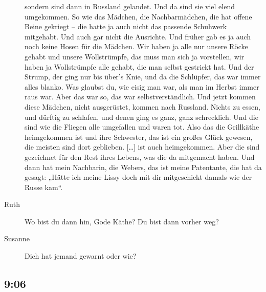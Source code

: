 \documentclass[ngerman,]{article}
\begin{document}
\begin{multicols}{3}
\begin{description}
sondern sind dann in Russland gelandet. Und da sind sie viel elend
umgekommen. So wie das Mädchen, die Nachbarmädchen, die hat offene Beine
gekriegt – die hatte ja auch nicht das passende Schuhwerk mitgehabt. Und
auch gar nicht die Ausrichte. Und früher gab es ja auch noch keine Hosen
für die Mädchen. Wir haben ja alle nur unsere Röcke gehabt und unsere
Wollstrümpfe, das muss man sich ja vorstellen, wir haben ja Wollstrümpfe
alle gehabt, die man selbst gestrickt hat. Und der Strump, der ging nur
bis über's Knie, und da die Schlüpfer, das war immer alles blanko. Was
glaubst du, wie eisig man war, als man im Herbst immer raus war. Aber
das war so, das war selbstverständlich. Und jetzt kommen diese Mädchen,
nicht ausgerüstet, kommen nach Russland. Nichts zu essen, und dürftig zu
schlafen, und denen ging es ganz, ganz schrecklich. Und die sind wie die
Fliegen alle umgefallen und waren tot. Also das die Grillkäthe
heimgekommen ist und ihre Schwester, das ist ein großes Glück gewesen,
die meisten sind dort geblieben. {[}\ldots{}{]} ist auch heimgekommen.
Aber die sind gezeichnet für den Rest ihres Lebens, was die da
mitgemacht haben. Und dann hat mein Nachbarin, die Webers, das ist meine
Patentante, die hat da gesagt: „Hätte ich meine Lissy doch mit dir
mitgeschickt damals wie der Russe kam“.
\item[Ruth]
Wo bist du dann hin, Gode Käthe? Du bist dann vorher weg?
\item[Susanne]
Dich hat jemand gewarnt oder wie?
\end{description}

\hypertarget{section-5}{%
\subsection{9:06}\label{section-5}}


\end{multicols}
\end{document}

